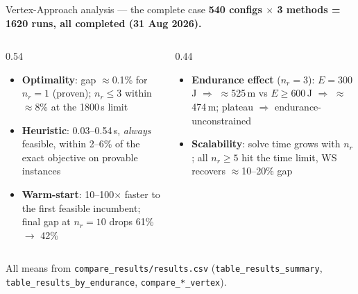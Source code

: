 \documentclass[aspectratio=169,10pt]{beamer}
\begin{document}


\begin{frame}{Vertex-Approach analysis — the complete case}
  \centering
  {\small \textbf{540 configs $\times$ 3 methods = 1620 runs, all completed (31 Aug 2026).}}
  \vspace{0.1cm}
  \begin{columns}[T,onlytextwidth]
    \begin{column}{0.54\textwidth}
      \begin{itemize}
        \item \textbf{Optimality}: gap $\approx$0.1\% for $n_r{=}1$ (proven); $n_r{\le}3$ within $\approx$8\% at the 1800\,s limit
        \item \textbf{Heuristic}: 0.03--0.54\,s, \emph{always} feasible, within 2--6\% of the exact objective on provable instances
        \item \textbf{Warm-start}: 10--100$\times$ faster to the first feasible incumbent; final gap at $n_r{=}10$ drops 61\% $\to$ 42\%
      \end{itemize}
    \end{column}
    \begin{column}{0.44\textwidth}
      \begin{itemize}
        \item \textbf{Endurance effect} ($n_r{=}3$): $E{=}300$\,J $\Rightarrow$ $\approx$525\,m vs $E{\ge}600$\,J $\Rightarrow$ $\approx$474\,m; plateau $\Rightarrow$ endurance-unconstrained
        \item \textbf{Scalability}: solve time grows with $n_r$; all $n_r{\ge}5$ hit the time limit, WS recovers $\approx$10--20\% gap
      \end{itemize}
    \end{column}
  \end{columns}
  \vspace{0.1cm}
  {\scriptsize All means from \texttt{compare\_results/results.csv} (\texttt{table\_results\_summary}, \texttt{table\_results\_by\_endurance}, \texttt{compare\_*\_vertex}).}
\end{frame}
\end{document}
